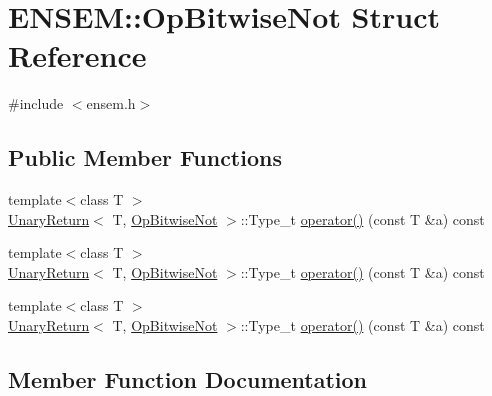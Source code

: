 \hypertarget{structENSEM_1_1OpBitwiseNot}{}\section{E\+N\+S\+EM\+:\+:Op\+Bitwise\+Not Struct Reference}
\label{structENSEM_1_1OpBitwiseNot}


{\ttfamily \#include $<$ensem.\+h$>$}

\subsection*{Public Member Functions}
\begin{DoxyCompactItemize}
\item 
{\footnotesize template$<$class T $>$ }\\\mbox{\hyperlink{structENSEM_1_1UnaryReturn}{Unary\+Return}}$<$ T, \mbox{\hyperlink{structENSEM_1_1OpBitwiseNot}{Op\+Bitwise\+Not}} $>$\+::Type\+\_\+t \mbox{\hyperlink{structENSEM_1_1OpBitwiseNot_acfac2b63c37a3d1c576ba131caf869f6}{operator()}} (const T \&a) const
\item 
{\footnotesize template$<$class T $>$ }\\\mbox{\hyperlink{structENSEM_1_1UnaryReturn}{Unary\+Return}}$<$ T, \mbox{\hyperlink{structENSEM_1_1OpBitwiseNot}{Op\+Bitwise\+Not}} $>$\+::Type\+\_\+t \mbox{\hyperlink{structENSEM_1_1OpBitwiseNot_acfac2b63c37a3d1c576ba131caf869f6}{operator()}} (const T \&a) const
\item 
{\footnotesize template$<$class T $>$ }\\\mbox{\hyperlink{structENSEM_1_1UnaryReturn}{Unary\+Return}}$<$ T, \mbox{\hyperlink{structENSEM_1_1OpBitwiseNot}{Op\+Bitwise\+Not}} $>$\+::Type\+\_\+t \mbox{\hyperlink{structENSEM_1_1OpBitwiseNot_acfac2b63c37a3d1c576ba131caf869f6}{operator()}} (const T \&a) const
\end{DoxyCompactItemize}


\subsection{Member Function Documentation}
\mbox{\label{structENSEM_1_1OpBitwiseNot_acfac2b63c37a3d1c576ba131caf869f6}} 
